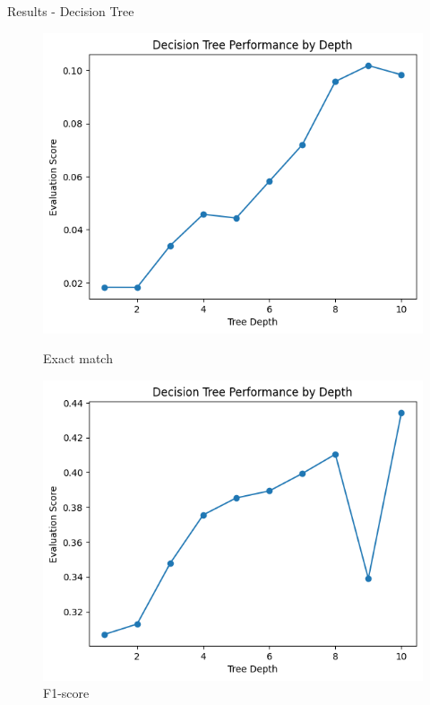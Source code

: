 \documentclass{beamer}
\begin{document}
\begin{frame}[t]{Results - Decision Tree}
\vspace{-3mm}
\begin{figure}[h]
	\centering
	\begin{minipage}{0.3\textwidth}
		\centering
		\includegraphics[width=\linewidth]{images/DecisionTree/exactmatch.png}
		\caption{Exact match}
	\end{minipage}
	\hfill
	\begin{minipage}{0.3\textwidth}
		\centering
		\includegraphics[width=\linewidth]{images/DecisionTree/f1_score.png}
		\caption{F1-score}
	\end{minipage}

\end{figure}
\end{frame}
\end{document}
